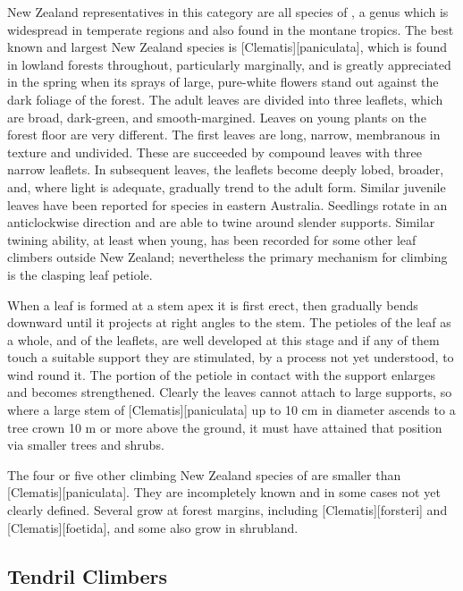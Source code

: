 New Zealand representatives in this category are all species of , a genus which is widespread in temperate regions and also found in the montane tropics.
The best known and largest New Zealand species is [Clematis][paniculata], which is found in lowland forests throughout, particularly marginally, and is greatly appreciated in the spring when its sprays of large, pure-white flowers stand out against the dark foliage of the forest.
The adult leaves are divided into three leaflets, which are broad, dark-green, and smooth-margined.
Leaves on young plants on the forest floor are very different.
The first leaves are long, narrow, membranous in texture and undivided.
These are succeeded by compound leaves with three narrow leaflets.
In subsequent leaves, the leaflets become deeply lobed, broader, and, where light is adequate, gradually trend to the adult form.
Similar juvenile leaves have been reported for  species in eastern Australia.
Seedlings rotate in an anticlockwise direction and are able to twine around slender supports.
Similar twining ability, at least when young, has been recorded for some other leaf climbers outside New Zealand; nevertheless the primary mechanism for climbing is the clasping leaf petiole.

When a leaf is formed at a stem apex it is first erect, then gradually bends downward until it projects at right angles to the stem.
The petioles of the leaf as a whole, and of the leaflets, are well developed at this stage and if any of them touch a suitable support they are stimulated, by a process not yet understood, to wind round it.
The portion of the petiole in contact with the support enlarges and becomes strengthened.
Clearly the leaves cannot attach to large supports, so where a large stem of [Clematis][paniculata] up to 10 cm in diameter ascends to a tree crown 10 m or more above the ground, it must have attained that position via smaller trees and shrubs.

The four or five other climbing New Zealand species of  are smaller than [Clematis][paniculata].
They are incompletely known and in some cases not yet clearly defined.
Several grow at forest margins, including [Clematis][forsteri] and [Clematis][foetida], and some also grow in shrubland.

\subsection{Tendril Climbers}

